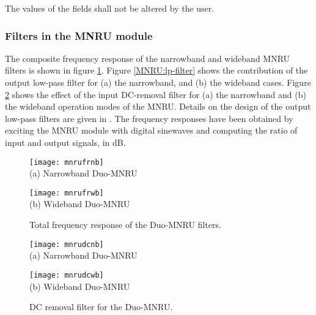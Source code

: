 The values of the fields shall not be altered by the user.


\subsubsection{Filters in the MNRU module}

The composite frequency response of the narrowband and wideband MNRU filters is shown in figure \ref{MNRU:both-filters}.
Figure \ref{MNRU:lp-filter} shows the contribution of the output low-pass filter for (a) the narrowband, and (b) the
wideband cases.
Figure \ref{MNRU:hp-filter} shows the effect of the input DC-removal filter for (a) the narrowband and (b) the wideband
operation modes of the MNRU.
Details on the design of the output low-pass filters are given in \cite{Duo-MNRU}.
The frequency responses have been obtained by exciting the MNRU module with digital sinewaves and computing the ratio
of input and output signals, in dB.


\begin{figure}[p]
  \begin{center}
    \texttt{[image: mnrufrnb]}
    \\
    (a) Narrowband Duo-MNRU

    \texttt{[image: mnrufrwb]}
    \\
    (b) Wideband Duo-MNRU
  \end{center}
  \caption{ Total frequency response of the Duo-MNRU filters.
            \label{MNRU:both-filters}
          }
\end{figure}

\begin{figure}[p]
  \begin{center}
    \texttt{[image: mnrudcnb]}
    \\
    (a) Narrowband Duo-MNRU

    \texttt{[image: mnrudcwb]}
    \\
    (b) Wideband Duo-MNRU
  \end{center}
  \caption{ DC removal filter for the Duo-MNRU. \label{MNRU:hp-filter} }
\end{figure}

